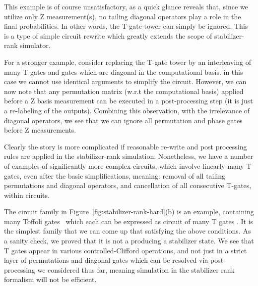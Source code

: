 This example is of course unsatisfactory, as a quick glance reveals that, since we utilize only Z measurement(s), no tailing diagonal operators play a role in the final probabilities. In other words, the T-gate-tower can simply be ignored. 
This is a type of simple circuit rewrite which greatly extends the scope of stabilizer-rank simulator.

For a stronger example, consider replacing the T-gate tower by an interleaving of many T gates and gates which are diagonal in the computational basis.
in this case we cannot use identical arguments to simplify the circuit.
However, we can now note that any permutation matrix (w.r.t the computational basis) applied before a Z basis measurement can be executed in a post-processing step (it is just a re-labeling of the outputs). Combining this observation, with the irrelevance of diagonal operators, we see that we can ignore all permutation and phase gates before Z measurements. 

Clearly the story is more complicated if reasonable re-write and post processing rules are applied in the stabilizer-rank simulation.
Nonetheless, we have a number of examples of significantly more complex circuits, which involve linearly many T gates, even after the basic simplifications, meaning: removal of all tailing permutations and diagonal operators, and cancellation of all consecutive T-gates, within circuits.

The circuit family in Figure~\ref{fig:stabilizer-rank-hard}(b) is an example, containing many Toffoli gates~\cite{Toffoli} which each can be expressed as circuit of many T gates .
It is the simplest family that we can come up that satisfying the above conditions.
As a sanity check, we proved that it is not a producing a stabilizer state.
We see that T gates appear in various controlled-Clifford operations, and not just in a strict layer of permutations and diagonal gates which can be resolved via post-processing we considered thus far, meaning simulation in the stabilizer rank formalism will not be efficient. 

